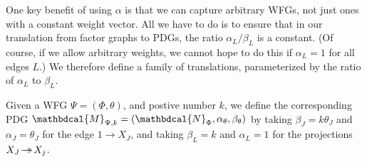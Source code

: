 \documentclass[letterpaper]{article} %
\theoremstyle{plain}
\theoremstyle{definition}
\theoremstyle{remark}
\newcommand{\tto}{\rightarrow\mathrel{\mspace{-15mu}}\rightarrow}
\newcommand{\dg}[1]{\mathbdcal{#1}}
\newcommand{\PDGof}[1]{{\dg M}_{#1}}
\newcommand{\UPDGof}[1]{{\dg N}_{#1}}
\begin{document}
One key benefit of using $\alpha$ is that we can
capture arbitrary WFGs, not just ones with a constant weight
vector.    All we have to do is to ensure that in our translation from
factor graphs to PDGs, the ratio $\alpha_L/\beta_L$ is a
constant.  (Of course, if we allow arbitrary weights, we cannot hope
to do this if $\alpha_L = 1$ for all edges $L$.)  
We therefore define a family of translations, parameterized by the
ratio of $\alpha_L$ to $\beta_L$.
\begin{defn}\label{def:wfg2pdg}
Given a WFG
$\Psi=(\Phi, \theta)$,
and postive number $k$, 
we define the corresponding PDG $\PDGof{\Psi,k} = (\UPDGof{\Phi},\alpha_{\theta}, \beta_{\theta})$ 
by taking $\beta_J = k \theta_J$ and $\alpha_J = \theta_J$ for the edge $1  \rightarrow X_J$, and
taking $\beta_L = k$ and $\alpha_L = 1$ for the projections $X_J \!\tto\! X_j$.
\end{defn}
\end{document}
